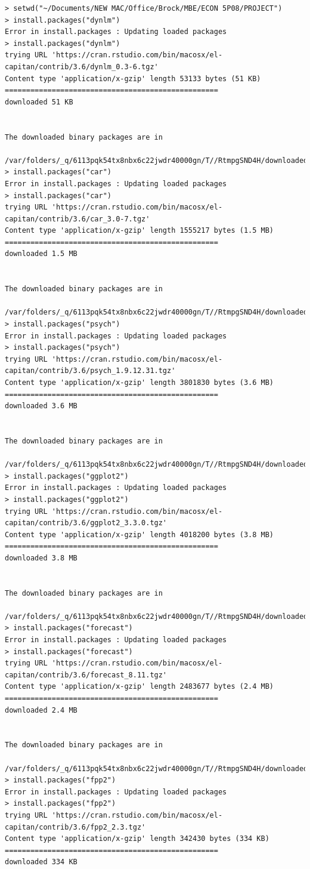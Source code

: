 \documentclass[12pt]{article}
\begin{document}
\begin{verbatim}
> setwd("~/Documents/NEW MAC/Office/Brock/MBE/ECON 5P08/PROJECT")
> install.packages("dynlm")
Error in install.packages : Updating loaded packages
> install.packages("dynlm")
trying URL 'https://cran.rstudio.com/bin/macosx/el-capitan/contrib/3.6/dynlm_0.3-6.tgz'
Content type 'application/x-gzip' length 53133 bytes (51 KB)
==================================================
downloaded 51 KB


The downloaded binary packages are in
	/var/folders/_q/6113pqk54tx8nbx6c22jwdr40000gn/T//RtmpgSND4H/downloaded_packages
> install.packages("car")
Error in install.packages : Updating loaded packages
> install.packages("car")
trying URL 'https://cran.rstudio.com/bin/macosx/el-capitan/contrib/3.6/car_3.0-7.tgz'
Content type 'application/x-gzip' length 1555217 bytes (1.5 MB)
==================================================
downloaded 1.5 MB


The downloaded binary packages are in
	/var/folders/_q/6113pqk54tx8nbx6c22jwdr40000gn/T//RtmpgSND4H/downloaded_packages
> install.packages("psych")
Error in install.packages : Updating loaded packages
> install.packages("psych")
trying URL 'https://cran.rstudio.com/bin/macosx/el-capitan/contrib/3.6/psych_1.9.12.31.tgz'
Content type 'application/x-gzip' length 3801830 bytes (3.6 MB)
==================================================
downloaded 3.6 MB


The downloaded binary packages are in
	/var/folders/_q/6113pqk54tx8nbx6c22jwdr40000gn/T//RtmpgSND4H/downloaded_packages
> install.packages("ggplot2")
Error in install.packages : Updating loaded packages
> install.packages("ggplot2")
trying URL 'https://cran.rstudio.com/bin/macosx/el-capitan/contrib/3.6/ggplot2_3.3.0.tgz'
Content type 'application/x-gzip' length 4018200 bytes (3.8 MB)
==================================================
downloaded 3.8 MB


The downloaded binary packages are in
	/var/folders/_q/6113pqk54tx8nbx6c22jwdr40000gn/T//RtmpgSND4H/downloaded_packages
> install.packages("forecast")
Error in install.packages : Updating loaded packages
> install.packages("forecast")
trying URL 'https://cran.rstudio.com/bin/macosx/el-capitan/contrib/3.6/forecast_8.11.tgz'
Content type 'application/x-gzip' length 2483677 bytes (2.4 MB)
==================================================
downloaded 2.4 MB


The downloaded binary packages are in
	/var/folders/_q/6113pqk54tx8nbx6c22jwdr40000gn/T//RtmpgSND4H/downloaded_packages
> install.packages("fpp2")
Error in install.packages : Updating loaded packages
> install.packages("fpp2")
trying URL 'https://cran.rstudio.com/bin/macosx/el-capitan/contrib/3.6/fpp2_2.3.tgz'
Content type 'application/x-gzip' length 342430 bytes (334 KB)
==================================================
downloaded 334 KB



\end{verbatim}
\end{document}
